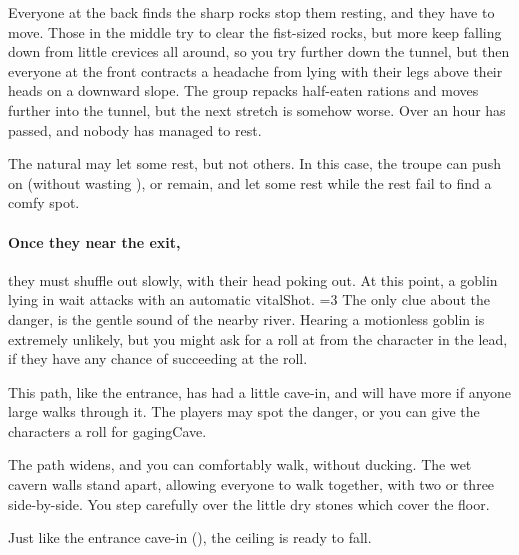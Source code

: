 \begin{multicols}{2}
\begin{boxtext}
  Everyone at the back finds the sharp rocks stop them resting, and they have to move.
  Those in the middle try to clear the fist-sized rocks, but more keep falling down from little crevices all around, so you try further down the tunnel, but then everyone at the front contracts a headache from lying with their legs above their heads on a downward slope.
  The group repacks half-eaten \glspl{ration} and moves further into the tunnel, but the next stretch is somehow worse.
  Over an hour has passed, and nobody has managed to rest.
\end{boxtext}

The \gls{natural} may let some rest, but not others.
In this case, the troupe can push on (without wasting ), or remain, and let some rest while the rest fail to find a comfy spot.

\paragraph{Once they near the exit,}
they must shuffle out slowly, with their head poking out.
At this point, a goblin lying in wait attacks with an automatic \gls{vitalShot}.
\ifnum\value{temperature}=3%
  The only clue about the danger, is the gentle sound of the nearby river.
\fi%
Hearing a motionless goblin is extremely unlikely, but you might ask for a  roll at \tn[16] from the character in the lead, if they have any chance of succeeding at the roll.


\playCommentaryDrowning[t]

This path, like the entrance, has had a little cave-in, and will have more if anyone large walks through it.
The players may spot the danger, or you can give the characters a roll for \gls{gagingCave}.

\begin{boxtext}
  The path widens, and you can comfortably walk, without ducking.
  The wet cavern walls stand apart, allowing everyone to walk together, with two or three side-by-side.
  You step carefully over the little dry stones which cover the floor.
\end{boxtext}

Just like the entrance cave-in (), the ceiling is ready to fall.


\end{multicols}
